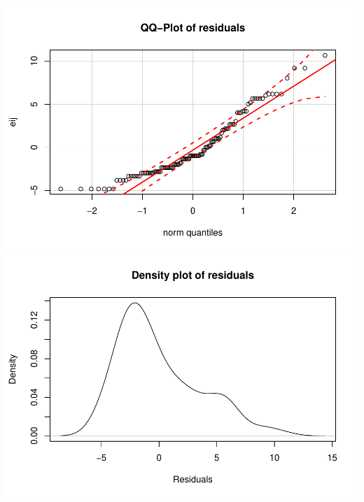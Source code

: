 \documentclass[]{book}
\begin{document}
\includegraphics{GreenwoodBanner_files/figure-latex/Figure3-11-1.pdf}
\includegraphics{GreenwoodBanner_files/figure-latex/Figure3-11-2.pdf}
\end{document}
